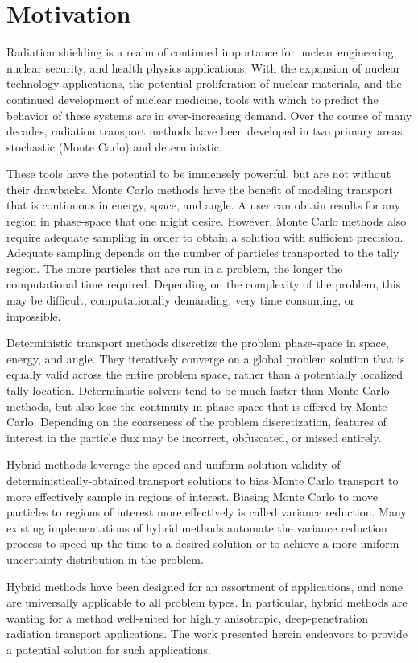 \section{Motivation}
\label{sec:motivation}

Radiation shielding is a realm of continued importance for nuclear engineering,
nuclear security, and health physics applications.
With the expansion of nuclear technology
applications,
the potential proliferation of nuclear materials, and the continued development of
nuclear medicine, tools with which to predict the behavior
of these systems are
in ever-increasing demand. Over the course of many decades, radiation
transport methods have been developed in two primary areas: stochastic (Monte
Carlo) and
deterministic.

These tools have the potential to be immensely
powerful, but are not without their drawbacks. Monte Carlo methods have the
benefit of modeling transport that is continuous in energy, space, and angle.
A user can obtain results for any region in phase-space that one might desire.
However, Monte Carlo methods also require adequate sampling in order to obtain a
solution with sufficient precision. Adequate sampling depends on the number of
particles transported to the tally region. The more particles that are run in a
problem, the
longer the computational time required. Depending on the complexity of the problem,
this may be difficult, computationally demanding, very time consuming,
or impossible.

Deterministic
transport methods discretize the problem phase-space in space, energy, and
angle. They iteratively converge on a global problem solution that is equally
valid across the entire problem space, rather than a potentially localized tally
location. Deterministic solvers tend to be much faster
than Monte Carlo methods, but also lose
the continuity in phase-space that is offered by Monte Carlo. Depending on the
coarseness of the problem discretization,
features of interest in the particle flux may be incorrect, obfuscated,
or missed entirely.

Hybrid methods leverage the speed and uniform solution validity of
deterministically-obtained transport solutions to bias Monte Carlo transport to
more effectively sample in regions of interest. Biasing Monte Carlo to move
particles to regions of interest more effectively
is called variance reduction. Many existing
implementations of hybrid methods
automate the variance reduction process to speed up the time to a
desired solution or to achieve a more uniform uncertainty distribution in the
problem.

Hybrid methods have been designed for an assortment of applications, and none are
universally applicable to all problem types. In particular, hybrid methods are
wanting for a method well-suited for
highly anisotropic, deep-penetration radiation transport applications. The work
presented herein endeavors to provide a potential solution for such applications.
